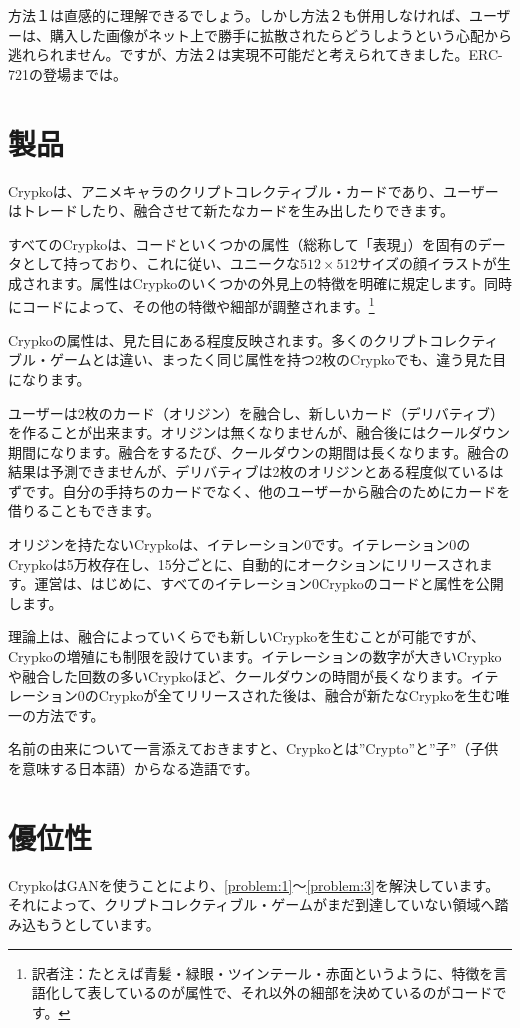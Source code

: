 \documentclass[xelatex,ja=standard]{bxjsarticle}
\begin{document}
方法１は直感的に理解できるでしょう。しかし方法２も併用しなければ、ユーザーは、購入した画像がネット上で勝手に拡散されたらどうしようという心配から逃れられません。ですが、方法２は実現不可能だと考えられてきました。ERC-721の登場までは。

\newpage

\section{製品}
Crypkoは、アニメキャラのクリプトコレクティブル・カードであり、ユーザーはトレードしたり、融合させて新たなカードを生み出したりできます。

すべてのCrypkoは、コードといくつかの属性（総称して「表現」）を固有のデータとして持っており、これに従い、ユニークな$512 \times 512$サイズの顔イラストが生成されます。属性はCrypkoのいくつかの外見上の特徴を明確に規定します。同時にコードによって、その他の特徴や細部が調整されます。\footnote{訳者注：たとえば青髪・緑眼・ツインテール・赤面というように、特徴を言語化して表しているのが属性で、それ以外の細部を決めているのがコードです。}

Crypkoの属性は、見た目にある程度反映されます。多くのクリプトコレクティブル・ゲームとは違い、まったく同じ属性を持つ2枚のCrypkoでも、違う見た目になります。

ユーザーは2枚のカード（オリジン）を融合し、新しいカード（デリバティブ）を作ることが出来ます。オリジンは無くなりませんが、融合後にはクールダウン期間になります。融合をするたび、クールダウンの期間は長くなります。融合の結果は予測できませんが、デリバティブは2枚のオリジンとある程度似ているはずです。自分の手持ちのカードでなく、他のユーザーから融合のためにカードを借りることもできます。

オリジンを持たないCrypkoは、イテレーション0です。イテレーション0のCrypkoは5万枚存在し、15分ごとに、自動的にオークションにリリースされます。運営は、はじめに、すべてのイテレーション0Crypkoのコードと属性を公開します。

理論上は、融合によっていくらでも新しいCrypkoを生むことが可能ですが、Crypkoの増殖にも制限を設けています。イテレーションの数字が大きいCrypkoや融合した回数の多いCrypkoほど、クールダウンの時間が長くなります。イテレーション0のCrypkoが全てリリースされた後は、融合が新たなCrypkoを生む唯一の方法です。

名前の由来について一言添えておきますと、Crypkoとは”Crypto”と”子”（子供を意味する日本語）からなる造語です。

\section{優位性}
CrypkoはGANを使うことにより、\ref{problem:1}〜\ref{problem:3}を解決しています。それによって、クリプトコレクティブル・ゲームがまだ到達していない領域へ踏み込もうとしています。
\end{document}
